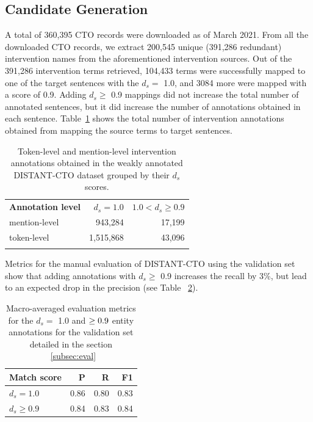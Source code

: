 \documentclass[11pt]{article}
\begin{document}
\subsection{Candidate Generation}
\label{subsec:res_cand}
%
A total of 360,395 CTO records were downloaded as of March 2021.
From all the downloaded CTO records, we extract 200,545 unique (391,286 redundant) intervention names from the aforementioned intervention sources.
Out of the 391,286 intervention terms retrieved, 104,433 terms were successfully mapped to one of the target sentences with the $d_s =$ 1.0, and 3084 more were mapped with a score of 0.9.
Adding $d_s \geq$ 0.9 mappings did not increase the total number of annotated sentences, but it did increase the number of annotations obtained in each sentence.
Table~\ref{table:res_candgen} shows the total number of intervention annotations obtained from mapping the source terms to target sentences.
%
\begin{table}[!htbp]
\centering
\begin{tabular}{lr|r}
\Xhline{1pt} \textbf{Annotation level} & \textbf{$d_s = 1.0$} & \textbf{$ 1.0 < d_s \geq 0.9$} \\ \Xhline{1pt}
mention-level & 943,284 & 17,199 \\
token-level & 1,515,868 & 43,096 \\
\Xhline{1pt}
\end{tabular}
\caption{Token-level and mention-level intervention annotations obtained in the weakly annotated DISTANT-CTO dataset grouped by their $d_s$ scores.}
\label{table:res_candgen} 
\end{table}
%
%
%
Metrics for the manual evaluation of DISTANT-CTO using the validation set show that adding annotations with $d_s \geq$ 0.9 increases the recall by 3\%, but lead to an expected drop in the precision (see Table ~\ref{tab:cangen_eval}).

\begin{table}[!htbp]
\centering
\begin{tabular}{lrrr}
\hline \textbf{Match score} & \textbf{P} & \textbf{R} & \textbf{F1} \\ \hline
$d_s = 1.0$ & 0.86 & 0.80 & 0.83 \\
$d_s \geq 0.9$ & 0.84 & 0.83 & 0.84 \\
\hline
\end{tabular}
\caption{Macro-averaged evaluation metrics for the $d_s =$ 1.0 and $\protect\geq 0.9$ entity annotations for the validation set detailed in the section ~\ref{subsec:eval}}
\label{tab:cangen_eval} 
\end{table}
%
%
%
\end{document}

